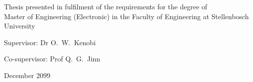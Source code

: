 \begin{titlepage}
\begin{center}

		{\large Thesis presented in fulfilment of the requirements for the degree of \\ Master of Engineering (Electronic) in the Faculty of Engineering at Stellenbosch University \par}
		
		

		\vfill
		
		{\large {Supervisor}: Dr O.\ W.\ Kenobi}\par
    	{\large {Co-supervisor}: Prof Q.\ G.\ Jinn}

		\vfill
		{\large December 2099}
        \vfill
	\end{center}
\end{titlepage}
